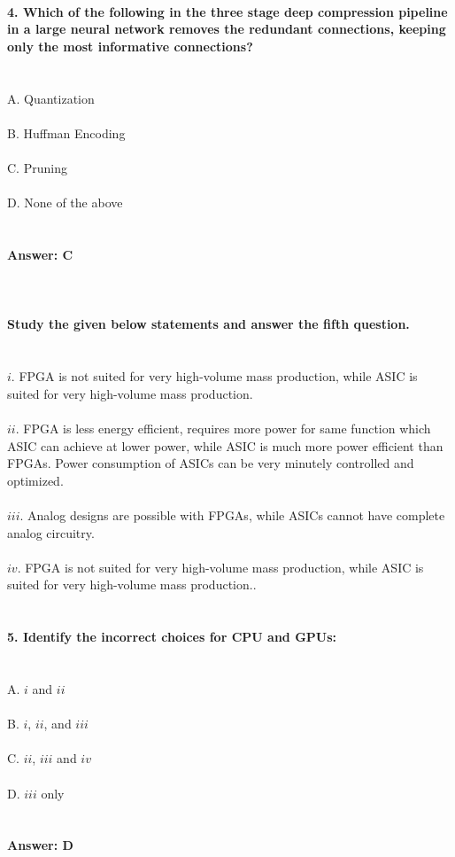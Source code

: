\documentclass[prl,twocolumn,showpacs,preprintnumbers,superscriptaddress]{revtex4}
\theoremstyle{plain}
\theoremstyle{definition}
\begin{document}
\begin{widetext}
\\
\\
\\
\textbf{4. Which of the following in the three stage deep compression pipeline in a large neural network removes the redundant connections, keeping only the most informative connections?}
\\
\\
\\
A. Quantization
\\
\\
B. Huffman Encoding
\\
\\
C. Pruning
\\
\\
D. None of the above
\\
\\
\\
\textbf{Answer: C}
\\
\\
\\
\\
\textbf{Study the given below statements and answer the fifth question.}
\\
\\
\\
$i$. FPGA is not suited for very high-volume mass production, while ASIC is suited for very high-volume mass production. 
\\
\\
$ii$. FPGA is less energy efficient, requires more power for same function which ASIC can achieve at lower power, while ASIC is much more power efficient than FPGAs. Power consumption of ASICs can be very minutely
controlled and optimized.
\\
\\
$iii$. Analog designs are possible with FPGAs, while ASICs cannot have complete analog circuitry.
\\
\\
$iv$. FPGA is not suited for very high-volume mass production, while ASIC is suited for very high-volume mass production..
\\
\\
\\
\textbf{5. Identify the incorrect choices for CPU and GPUs:}
\\
\\
\\
A. $i$ and $ii$
\\
\\
B. $i$, $ii$, and $iii$
\\
\\
C. $ii$, $iii$ and $iv$ 
\\
\\
D. $iii$ only
\\
\\
\\
\textbf{Answer: D}
\\
\\
\\
\\
\\
\\
\\
\\
\\
\end{widetext}
\end{document}
